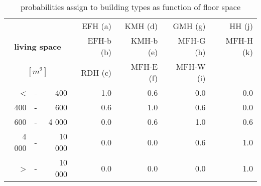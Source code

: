 \begin{table}[htb]
  \centering
  \caption{probabilities assign to building types as function of floor space}
  \label{tab:pls}
  \begin{tabular}{rcr rrrr}
    \toprule
    &&&
    EFH (a)  & KMH (d)   & GMH (g)   & HH (j) \\ 
    \multicolumn{3}{c}{\textbf{living space}}& 
    EFH-b (b)& KMH-b (e)& MFH-G (h)& MFH-H (k)\\
    \multicolumn{3}{c}{$[m^2]$}& 
    RDH (c)   & MFH-E (f)& MFH-W (i)& \\
    \midrule
\textless &-&    400     & 1.0 & 0.6 & 0.0 & 0.0 \\
      400 &-&    600     & 0.6 & 1.0 & 0.6 & 0.0 \\
      600 &-&  4 000     & 0.0 & 0.6 & 1.0 & 0.6 \\
    4 000 &-& 10 000     & 0.0 & 0.0 & 0.6 & 1.0 \\
\textgreater  &-& 10 000     & 0.0 & 0.0 & 0.0 & 1.0 \\
    \bottomrule
  \end{tabular}
\end{table}
